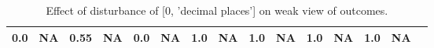 \begin{table}
\begin{tabular}{l|cc|cc|cc|cc|cc|cc|cc}
\cellcolor{Bittersweet}0.0&\cellcolor{Bittersweet}NA&\cellcolor{Bittersweet}0.55&\cellcolor{Bittersweet}NA&\cellcolor{Bittersweet}0.0&\cellcolor{Bittersweet}NA&\cellcolor{Bittersweet}1.0&\cellcolor{Bittersweet}NA&\cellcolor{Bittersweet}1.0&\cellcolor{Bittersweet}NA&\cellcolor{Bittersweet}1.0&\cellcolor{Bittersweet}NA&\cellcolor{Bittersweet}1.0&\cellcolor{Bittersweet}NA\\\bottomrule\end{tabular}\caption{Effect of disturbance of [0, 'decimal places'] on weak view of outcomes.}\end{table}